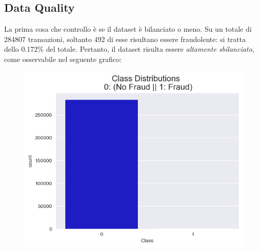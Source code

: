 \documentclass[]{article}
\begin{document}
    \subsection{Data Quality}
        La prima cosa che controllo è se il dataset è bilanciato o meno. Su un totale di 284807 transazioni, soltanto 492 di esse risultano essere fraudolente: si tratta dello 0.172\% del totale. Pertanto, il dataset risulta essere \textit{altamente sbilanciato}, come osservabile nel seguente grafico:
        \begin{figure}[H]
            \centering
            \includegraphics[width=.6\textwidth]{img/classDistribution.png}
            \caption[short]{}
        \end{figure}
\end{document}
